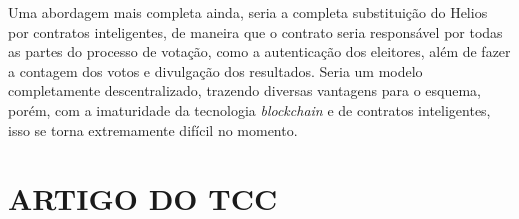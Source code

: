 \documentclass{ufsctex/ufsctex}
\begin{document}
Uma abordagem mais completa ainda, seria a completa substituição do Helios por
contratos inteligentes, de maneira que o contrato seria responsável por todas
as partes do processo de votação, como a autenticação dos eleitores, além de
fazer a contagem dos votos e divulgação dos resultados. Seria um modelo
completamente descentralizado, trazendo diversas vantagens para o esquema,
porém, com a imaturidade da tecnologia \textit{blockchain} e de contratos
inteligentes, isso se torna extremamente difícil no momento.




\apendice{}

\chapter{ARTIGO DO TCC}
\end{document}
